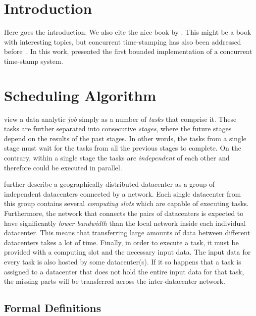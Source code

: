 
\theoremstyle{definition}
\newtheorem{definition}{Definition}[section]

\theoremstyle{definition}
\newtheorem{optimization}{Optimization Problem}

\section{Introduction}

Here goes the introduction. We also cite the nice book by \citet{Pinedo:2012}.
This might be a book with interesting topics, but concurrent time-stamping has also been addressed before~\cite{Dolev97}.
In this work, \citet{Dolev97} presented the first bounded implementation of a concurrent time-stamp system.

\section{Scheduling Algorithm}

\citet*{Chen2017} view a data analytic \emph{job} simply as a number of \emph{tasks} that comprise it. These tasks are further separated into consecutive \emph{stages}, where the future stages depend on the results of the past stages. In other words, the tasks from a single stage must wait for the tasks from all the previous stages to complete. On the contrary, within a single stage the tasks are \emph{independent} of each other and therefore could be executed in parallel.

\citet{Chen2017} further describe a geographically distributed datacenter as a group of independent datacenters connected by a network. Each single datacenter from this group contains several \emph{computing slots} which are capable of executing tasks. Furthermore, the network that connects the pairs of datacenters is expected to have significantly \emph{lower bandwidth} than the local network inside each individual datacenter. This means that transferring large amounts of data between different datacenters takes a lot of time. Finally, in order to execute a task, it must be provided with a computing slot and the necessary input data. The input data for every task is also hosted by some datacenter(s). If it so happens that a task is assigned to a datacenter that does not hold the entire input data for that task, the missing parts will be transferred across the inter-datacenter network.

\subsection{Formal Definitions}

